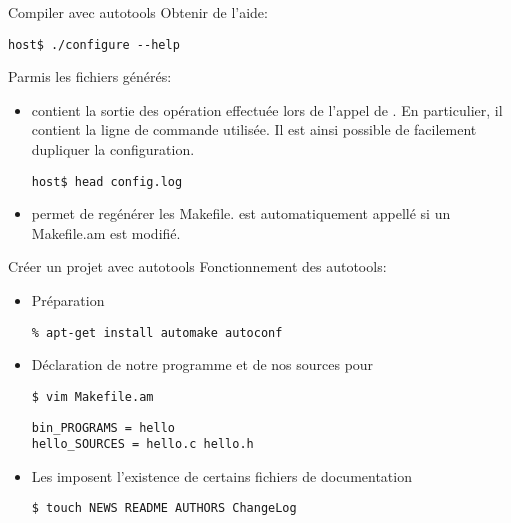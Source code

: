 \begin{frame}[fragile=singleslide]{Compiler avec autotools}
  Obtenir de l'aide:
\begin{lstlisting}
host$ ./configure --help
\end{lstlisting} %

  Parmis les fichiers générés:
  \begin{itemize}
  \item {}  contient la sortie  des opération effectuée
    lors de l'appel de .  En particulier, il contient
    la ligne de commande utilisée. Il est ainsi possible de facilement
    dupliquer la configuration.
\begin{lstlisting}
host$ head config.log
\end{lstlisting} %
  \item     {}     permet     de    regénérer     les
    Makefile.   est  automatiquement appellé  si un
    Makefile.am est modifié.
  \end{itemize}
\end{frame}


\begin{frame}[fragile=singleslide]{Créer un projet avec autotools}
  Fonctionnement des autotools:
  \begin{itemize}
  \item Préparation
\begin{lstlisting}
% apt-get install automake autoconf
\end{lstlisting}
  \item Déclaration de notre programme et de nos sources pour 
\begin{lstlisting}
$ vim Makefile.am
\end{lstlisting} %
\begin{lstlisting}
bin_PROGRAMS = hello
hello_SOURCES = hello.c hello.h
\end{lstlisting}
  \item Les   imposent l'existence de certains fichiers
    de documentation
\begin{lstlisting}
$ touch NEWS README AUTHORS ChangeLog
\end{lstlisting} %
  \end{itemize}
\end{frame}


